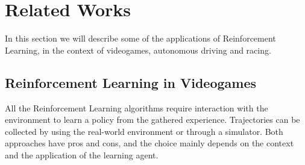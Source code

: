 \section{Related Works}



In this section we will describe some of the applications of Reinforcement Learning, in the context of videogames, autonomous driving and racing. 


\subsection{Reinforcement Learning in Videogames}

All the Reinforcement Learning algorithms require interaction with the environment to learn a policy from the gathered experience. Trajectories can be collected by using the real-world environment or through a simulator. 
Both approaches have pros and cons, and the choice mainly depends on the context and the application of the learning agent. 


